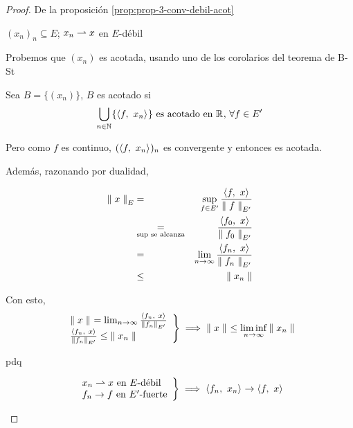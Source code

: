 
\renewcommand{\catnum}{\theNPclase \ No Presencial}%
\renewcommand{\fecha}{5 de mayo de 2020}


\begin{proof}
De la proposición \ref{prop:prop-3-conv-debil-acot}

\begin{ienumerate}
    \item $(x_n)_n \subseteq E$; $x_n \convdebil x$ en $E$-débil
    
    Probemos que $(x_n)$ es acotada, usando uno de los corolarios del teorema de B-St
    
    Sea $B=\{(x_n)\}$, $B$ es acotado si 
    \begin{equation}
        \bigcup_{n \in \nn} \{\prodint[]{f}{x_n} \} \text{ es acotado en $\rr$, $\forall f \in E'$}
    \end{equation}
    
    Pero como $f$ es continuo, $(\prodint[]{f}{x_n})_n$ es convergente y entonces es acotada.
    
    Además, razonando por dualidad, 
    
    \begin{eqnarray}
        \norm[E]{x} 
        &=& \sup_{f \in E'} \frac{\prodint[]{f}{x}}{\norm[E']{f}} \\
        &\underset{\text{sup se alcanza}}{=}& \frac{\prodint[]{f_0}{x}}{\norm[E']{f_0}} \\
        &=& \lim_{n \to \infty} \frac{\prodint[]{f_n}{x}}{\norm[E']{f_n}} \\
        &\leq& \norm[]{x_n}
    \end{eqnarray}
    
    Con esto,
    \begin{equation}
    \left.\begin{array}{l}
         \norm[]{x} = \lim_{n \to \infty} \frac{\prodint[]{f_n}{x}}{\norm[E']{f_n}}\\
         \frac{\prodint[]{f_n}{x}}{\norm[E']{f_n}} \leq \norm[]{x_n}
    \end{array}\right\} \implies \norm[]{x} \leq \liminf_{n\to\infty} \norm[]{x_n}
    \end{equation}
    
    \item pdq 
    
    \begin{equation}
    \left.\begin{array}{l}
         x_n \convdebil x \text{ en $E$-débil}\\
         f_n \to f \text{ en $E'$-fuerte}\\
    \end{array}\right\} \implies \prodint[]{f_n}{x_n} \to \prodint[]{f}{x}
    \end{equation}
    

\end{ienumerate}
\end{proof}

